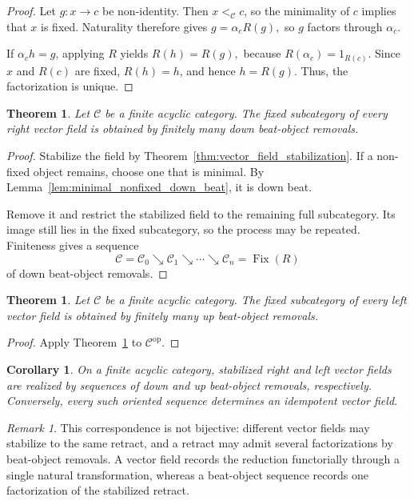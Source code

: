 \documentclass[12pt]{amsart}
\newtheorem{theorem}[teo]{Theorem}
\newtheorem{corollary}[teo]{Corollary}
\theoremstyle{definition}
\theoremstyle{remark}
\newtheorem{remark}[teo]{Remark}
\numberwithin{figure}{section}%
\newcommand{\CC}{\mathcal{C}}
\newcommand{\op}{\mathrm{op}}
\begin{document}
\begin{proof}
Let \(g\colon x\to c\) be non-identity. Then \(x<_\CC c\), so the
minimality of \(c\) implies that \(x\) is fixed. Naturality therefore gives
\(
g=\alpha_cR(g),
\)
so \(g\) factors through \(\alpha_c\).

If \(\alpha_ch=g\), applying \(R\) yields
\(
R(h)=R(g),
\)
because \(R(\alpha_c)=1_{R(c)}\). Since \(x\) and \(R(c)\) are fixed,
\(R(h)=h\), and hence \(h=R(g)\). Thus, the factorization is unique.
\end{proof}

\begin{theorem}\label{thm:right_field_down_beat_reduction}
Let \(\CC\) be a finite acyclic category. The fixed subcategory of every
right vector field is obtained by finitely many down beat-object removals.
\end{theorem}

\begin{proof}
Stabilize the field by
Theorem~\ref{thm:vector_field_stabilization}. If a non-fixed object
remains, choose one that is minimal. By
Lemma~\ref{lem:minimal_nonfixed_down_beat}, it is down beat.

Remove it and restrict the stabilized field to the remaining full
subcategory. Its image still lies in the fixed subcategory, so the process
may be repeated. Finiteness gives a sequence
\[
\CC=\CC_0\searrow\CC_1\searrow\cdots\searrow\CC_n
=
\operatorname{Fix}(R)
\]
of down beat-object removals.
\end{proof}

\begin{theorem}\label{thm:left_field_up_beat_reduction}
Let \(\CC\) be a finite acyclic category. The fixed subcategory of every
left vector field is obtained by finitely many up beat-object removals.
\end{theorem}

\begin{proof}
Apply Theorem~\ref{thm:right_field_down_beat_reduction} to
\(\CC^{\op}\).
\end{proof}

\begin{corollary}\label{cor:vector_fields_beat_reductions}
On a finite acyclic category, stabilized right and left vector fields are
realized by sequences of down and up beat-object removals, respectively.
Conversely, every such oriented sequence determines an idempotent vector
field.
\end{corollary}

\begin{remark}\label{rem:fields_more_than_beat_sequence}
This correspondence is not bijective: different vector fields may
stabilize to the same retract, and a retract may admit several
factorizations by beat-object removals. A vector field records the
reduction functorially through a single natural transformation, whereas a
beat-object sequence records one factorization of the stabilized retract.
\end{remark}
\end{document}

